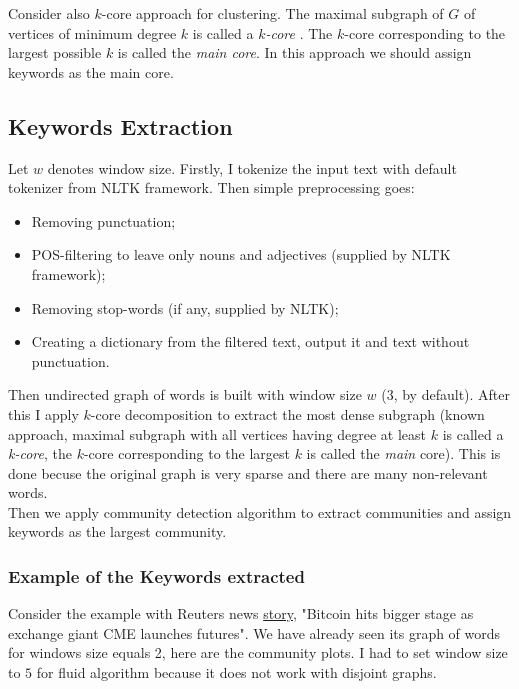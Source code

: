 \documentclass[a4paper]{article}
\begin{document}
Consider also $k$-core approach for clustering. The maximal subgraph of $G$ of vertices of minimum degree $k$ is called a \textit{$k$-core} \cite{Peng:KCore}. The $k$-core corresponding to the largest possible $k$ is called the \textit{main core}. In this approach we should assign keywords as the main core.

\subsection*{Keywords Extraction}
Let $w$ denotes window size. Firstly, I tokenize the input text with default tokenizer from NLTK framework. Then simple preprocessing goes:
\begin{itemize}
\item Removing punctuation;
\item POS-filtering to leave only nouns and adjectives (supplied by NLTK framework);
\item Removing stop-words (if any, supplied by NLTK);
\item Creating a dictionary from the filtered text, output it and text without punctuation.
\end{itemize}
Then undirected graph of words is built with window size $w$ ($3$, by default). After this I apply $k$-core decomposition to extract the most dense subgraph (known approach, maximal subgraph with all vertices having degree at least $k$ is called a \textit{k-core}, the $k$-core corresponding to the largest $k$ is called the \textit{main} core). This is done becuse the original graph is very sparse and there are many non-relevant words.\\

Then we apply community detection algorithm to extract communities and assign keywords as the largest community.

\subsubsection*{Example of the Keywords extracted}

Consider the example with Reuters news \href{https://uk.reuters.com/article/us-bitcoin-futures/exchange-giant-cmes-bitcoin-futures-get-tepid-take-up-in-debut-idUKKBN1EB04N}{story}, "Bitcoin hits bigger stage as exchange giant CME launches futures". We have already seen its graph of words for windows size equals 2, here are the community plots. I had to set window size to $5$ for fluid algorithm because it does not work with disjoint graphs.
\end{document}
